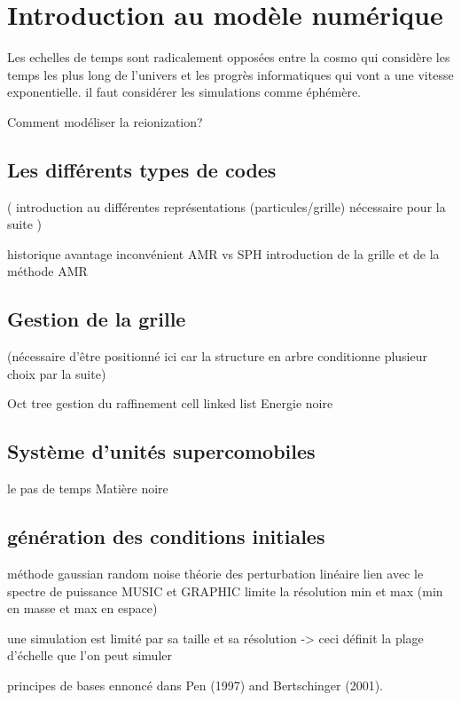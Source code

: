 \chapter{Introduction au modèle numérique}\label{ch:introduction}

Les echelles de temps sont radicalement opposées entre la cosmo qui considère les temps les plus long de l'univers et les progrès informatiques qui vont a une vitesse exponentielle. il faut considérer les simulations comme éphémère.

Comment modéliser la reionization?

\section{Les différents types de codes}

( introduction au différentes représentations (particules/grille) nécessaire pour la suite )

historique
avantage inconvénient AMR vs SPH
introduction de la grille et de la méthode AMR

\section{Gestion de la grille}

(nécessaire d'être positionné ici car la structure en arbre conditionne plusieur choix par la suite)

Oct tree
gestion du raffinement
cell linked list
Energie noire

\section{Système d'unités supercomobiles}
le pas de temps
Matière noire

\section{génération des conditions initiales}

méthode
gaussian random noise
théorie des perturbation linéaire
lien avec le spectre de puissance
MUSIC et GRAPHIC
limite la résolution min et max (min en masse et max en espace)


une simulation est limité par sa taille et sa résolution -> ceci définit la plage d'échelle que l'on peut simuler

principes de bases ennoncé dans Pen (1997) and Bertschinger (2001).


